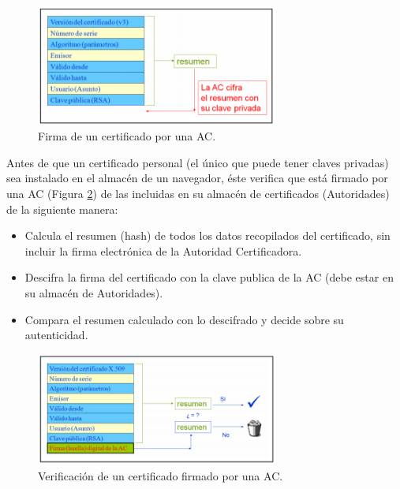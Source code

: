 \documentclass[12pt, a4paper, titlepage]{report}
\begin{document}
        \begin{figure}[H]
    		\begin{center}	                  
    		    \includegraphics[width=8cm]{./imagenes/MarcoTeorico/FirmaCertificadoAC.png}
    			\caption{Firma de un certificado por una AC.}
    			\label{fig:AC_validacion}
    		\end{center}
    	\end{figure}
        
        Antes de que un certificado personal (el único que puede tener claves privadas) sea instalado en el almacén de un navegador, éste verifica que está firmado por una AC (Figura \ref{fig:AC_verificacion}) de las incluidas en su almacén de certificados (Autoridades) de la siguiente manera:
        \begin{itemize}
            \item Calcula el resumen (hash) de todos los datos recopilados del certificado, sin incluir la firma electrónica de la Autoridad Certificadora.
            \item Descifra la firma del certificado con la clave publica de la AC (debe estar en su almacén de Autoridades).
            \item Compara el resumen calculado con lo descifrado y decide sobre su autenticidad.
        \end{itemize}
        
        \begin{figure}[H]
			\begin{center}	                  
			    \includegraphics[width=8cm]{./imagenes/MarcoTeorico/VerificacionCertificado.png}
				\caption{Verificación de un certificado firmado por una AC.}
				\label{fig:AC_verificacion}
			\end{center}
		\end{figure}
        
\end{document}
